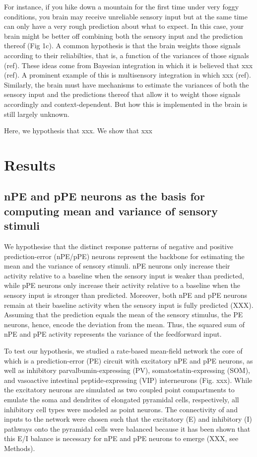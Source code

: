 \documentclass[10pt,a4paper,draft]{article}
\begin{document}
For instance, if you hike down a mountain for the first time under very foggy conditions, you brain may receive unreliable sensory input but at the same time can only have a very rough prediction about what to expect. In this case, your brain might be better off combining both the sensory input and the prediction thereof (Fig 1c). A common hypothesis is that the brain weights those signals according to their reliabilties, that is, a function of the variances of those signals (ref). These ideas come from Bayesian integration in which it is believed that xxx (ref). A prominent example of this is multisensory integration in which xxx (ref). Similarly, the brain must have mechanisms to estimate the variances of both the sensory input and the predictions thereof that allow it to weight those signals accordingly and context-dependent. But how this is implemented in the brain is still largely unknown.

Here, we hypothesis that xxx. 
We show that xxx


\section*{Results}
%

\subsection*{nPE and pPE neurons as the basis for computing mean and variance of sensory stimuli}
%
We hypothesise that the distinct response patterns of negative and positive prediction-error (nPE/pPE) neurons represent the backbone for estimating the mean and the variance of sensory stimuli. nPE neurons only increase their activity relative to a baseline when the sensory input is weaker than predicted, while pPE neurons only increase their activity relative to a baseline when the sensory input is stronger than predicted. Moreover, both nPE and pPE neurons remain at their baseline activity when the sensory input is fully predicted (XXX). Assuming that the prediction equals the mean of the sensory stimulus, the PE neurons, hence, encode the deviation from the mean. Thus, the squared sum of nPE and pPE activity represents the variance of the feedforward input. 

To test our hypothesis, we studied a rate-based mean-field network the core of which is a prediction-error (PE) circuit with excitatory nPE and pPE neurons, as well as inhibitory parvalbumin-expressing (PV), somatostatin-expressing (SOM), and vasoactive intestinal peptide-expressing (VIP) interneurons (Fig. xxx). While the excitatory neurons are simulated as two coupled point compartments to emulate the soma and dendrites of elongated pyramidal cells, respectively, all inhibitory cell types were modeled as point neurons. The connectivity of and inputs to the network were chosen such that the excitatory (E) and inhibitory (I) pathways onto the pyramidal cells were balanced because it has been shown that this E/I balance is necessary for nPE and pPE neurons to emerge (XXX, see Methods). 
\end{document}
